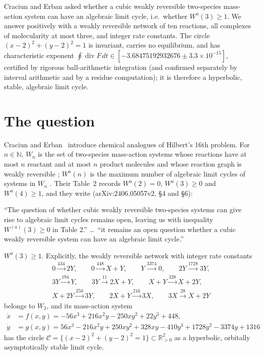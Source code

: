 \documentclass[11pt,a4paper]{report}
\begin{document}
\makepapertitle

\begin{paperabstract}
Craciun and Erban asked whether a cubic weakly reversible two-species mass-action system can have an algebraic limit
cycle, i.e.\ whether \(W^a(3)\ge1\). We answer positively with a weakly reversible network of ten reactions, all
complexes of molecularity at most three, and integer rate constants. The circle \((x-2)^2+(y-2)^2=1\) is invariant,
carries no equilibrium, and has characteristic exponent
\(\oint\operatorname{div}F\,dt\in[-3.68475192932676\pm3.3\times10^{-15}]\), certified by rigorous ball-arithmetic
integration (and confirmed separately by interval arithmetic and by a residue computation); it is therefore a
hyperbolic, stable, algebraic limit cycle.
\end{paperabstract}

\section*{The question}

Craciun and Erban~\autocite{CraciunErban2025} introduce chemical analogues of Hilbert's 16th problem. For
\(n\in\mathbb N\), \(W_n\) is the set of two-species mass-action systems whose reactions have at most \(n\) reactant and
at most \(n\) product molecules and whose reaction graph is weakly reversible \autocite[Definitions~2--3]{CraciunErban2025};
\(W^a(n)\) is the maximum number of algebraic limit cycles of systems in \(W_n\)
\autocite[Definition~5]{CraciunErban2025}. Their Table~2 records \(W^a(2)=0\), \(W^a(3)\ge0\) and \(W^a(4)\ge1\), and
they write (arXiv:2406.05057v2, §4 and §6):

\begin{openquote}
``The question of whether cubic weakly reversible two-species systems can give rise to algebraic limit cycles
remains open, leaving us with inequality \(W^{(a)}(3)\ge 0\) in Table 2.'' \dots\
``it remains an open question whether a cubic weakly reversible system can have an algebraic limit cycle.''
\end{openquote}

\begin{theorem}\label{thm:main}
\(W^a(3)\ge1\). Explicitly, the weakly reversible network with integer rate constants
\[
\begin{aligned}
&0\xrightarrow{434}2Y,\qquad 0\xrightarrow{448}X+Y,\qquad Y\xrightarrow{3374}0,\qquad 2Y\xrightarrow{1728}3Y,\\
&3Y\xrightarrow{194}Y,\qquad 3Y\xrightarrow{11}2X+Y,\qquad X+Y\xrightarrow{328}X+2Y,\\
&X+2Y\xrightarrow{250}3Y,\qquad 2X+Y\xrightarrow{216}3X,\qquad 3X\xrightarrow{28}X+2Y
\end{aligned}
\]
belongs to \(W_3\), and its mass-action system
\[
\begin{aligned}
\dot x&=f(x,y)=-56x^3+216x^2y-250xy^2+22y^3+448,\\
\dot y&=g(x,y)=56x^3-216x^2y+250xy^2+328xy-410y^3+1728y^2-3374y+1316
\end{aligned}
\]
has the circle \(\mathcal C=\{(x-2)^2+(y-2)^2=1\}\subset\mathbb R^2_{>0}\) as a hyperbolic, orbitally asymptotically
stable limit cycle.
\end{theorem}
\end{document}
